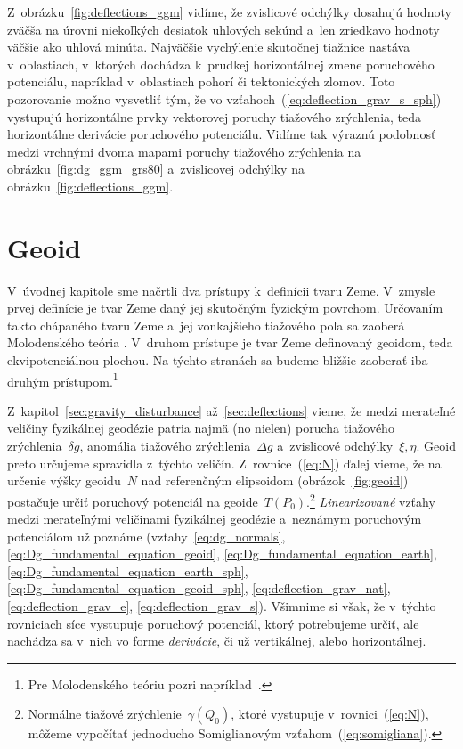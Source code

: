 \documentclass[a4paper, 12pt]{book}
\begin{document}
Z~obrázku~\ref{fig:deflections_ggm} vidíme, že zvislicové odchýlky dosahujú 
hodnoty zväčša na úrovni niekoľkých desiatok uhlových sekúnd a~len zriedkavo 
hodnoty väčšie ako uhlová minúta.  Najväčšie vychýlenie skutočnej tiažnice 
nastáva v~oblastiach, v~ktorých dochádza k~prudkej horizontálnej zmene 
poruchového potenciálu, napríklad v~oblastiach pohorí či tektonických zlomov.  
Toto pozorovanie možno vysvetliť tým, že vo 
vzťahoch~(\ref{eq:deflection_grav_s_sph}) vystupujú horizontálne prvky 
vektorovej poruchy tiažového zrýchlenia, teda horizontálne derivácie 
poruchového potenciálu.  Vidíme tak výraznú podobnosť medzi vrchnými dvoma 
mapami poruchy tiažového zrýchlenia na obrázku~\ref{fig:dg_ggm_grs80} 
a~zvislicovej odchýlky na obrázku~\ref{fig:deflections_ggm}.







\chapter{Geoid}
\label{sec:geoid}

V~úvodnej kapitole sme načrtli dva prístupy k~definícii tvaru Zeme.  V~zmysle 
prvej definície je tvar Zeme daný jej skutočným fyzickým povrchom.  Určovaním 
takto chápaného tvaru Zeme a~jej vonkajšieho tiažového poľa sa zaoberá 
Molodenského teória 
\parencite{Molodensky1962,Borre_chapter8,MoritzAdvancedGeodesy,MoritzPhysicalGeodesy}.  
V~druhom prístupe je tvar Zeme definovaný geoidom, teda ekvipotenciálnou 
plochou.  Na týchto stranách sa budeme bližšie zaoberať iba druhým 
prístupom.\footnote{Pre Molodenského teóriu pozri 
napríklad~\textcite{Janak2006}.}

Z~kapitol~\ref{sec:gravity_disturbance} až~\ref{sec:deflections} vieme, že 
medzi merateľné veličiny fyzikálnej geodézie patria najmä (no nielen) porucha 
tiažového zrýchlenia~$\delta g$, anomália tiažového zrýchlenia~$\Delta g$ 
a~zvislicové odchýlky~$\xi, \eta$.  Geoid preto určujeme spravidla z~týchto 
veličín.  Z~rovnice~(\ref{eq:N}) ďalej vieme, že na určenie výšky geoidu~$N$ 
nad referenčným elipsoidom (obrázok~\ref{fig:geoid}) postačuje určiť poruchový 
potenciál na geoide~$T(P_0)$.\footnote{Normálne tiažové 
zrýchlenie~$\gamma(Q_0)$, ktoré vystupuje v~rovnici~(\ref{eq:N}), môžeme 
vypočítať jednoducho Somiglianovým vzťahom~(\ref{eq:somigliana}).}  
\emph{Linearizované} vzťahy medzi merateľnými veličinami fyzikálnej geodézie 
a~neznámym poruchovým potenciálom už poznáme (vzťahy~\ref{eq:dg_normals}, 
\ref{eq:Dg_fundamental_equation_geoid}, \ref{eq:Dg_fundamental_equation_earth}, 
\ref{eq:Dg_fundamental_equation_earth_sph}, 
\ref{eq:Dg_fundamental_equation_geoid_sph}, \ref{eq:deflection_grav_nat}, 
\ref{eq:deflection_grav_e}, \ref{eq:deflection_grav_s}).  Všimnime si však, že 
v~týchto rovniciach síce vystupuje poruchový potenciál, ktorý potrebujeme 
určiť, ale nachádza sa v~nich vo forme \emph{derivácie}, či už vertikálnej, 
alebo horizontálnej.
\end{document}

